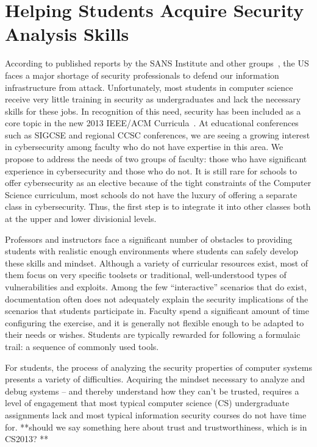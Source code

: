 

%


\section{Helping Students Acquire Security Analysis Skills}
\label{sec:intro}

According to published reports by the SANS Institute and other 
groups~\cite{defensenewsshortage}, the US faces a major shortage of 
security professionals to defend our information infrastructure from
attack.  Unfortunately, most students 
in computer science receive very little training in security as
undergraduates and lack the necessary skills 
for these jobs.  In recognition of this need, security has been included as
a core topic in the new 2013 
IEEE/ACM Curricula~\cite{acmcurriculum}.   At educational conferences such
as SIGCSE and regional CCSC conferences, we are seeing a growing interest 
in cybersecurity among faculty who do not have expertise in this area.
We propose to address the needs of two groups of faculty: those who have
significant experience in cybersecurity and those who do not.
It is still
rare for schools to offer cybersecurity as an elective
because of the tight 
constraints of the Computer Science curriculum, most schools 
do not have the luxury of offering a separate class in cybersecurity.  Thus, 
the first step is to integrate it into other classes both at the upper and lower divisionial
levels.


 Professors and instructors face a significant number of
obstacles to providing students with realistic enough environments
where students can safely develop these skills and mindset.  Although
a variety of curricular resources exist, most of them focus on very specific
toolsets or traditional, well-understood types of vulnerabilities and
exploits.  Among the few ``interactive'' scenarios that do exist, documentation
 often  does not adequately explain the
security implications of the scenarios that students participate in.  Faculty
spend a significant amount of time configuring the exercise, and it is 
generally not flexible enough to be adapted to their needs or wishes.
Students are typically rewarded for following a formulaic trail: a sequence
of commonly used tools.  

For students, the process of analyzing the security
properties of computer systems presents a variety of difficulties.
Acquiring the mindset necessary to analyze and debug systems -- and
thereby understand how they can't be trusted, requires a level
of engagement that most typical computer science (CS) undergraduate assignments lack and
most typical information security courses do not have time for.  **should we say something
here about trust and trustworthiness, which is in CS2013? **

